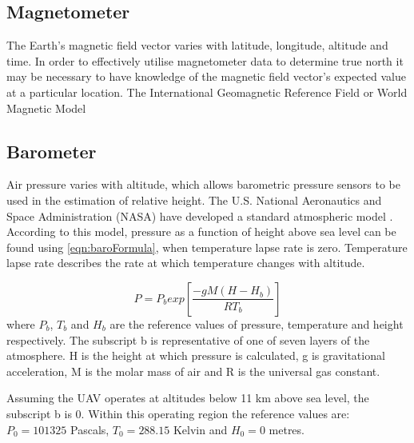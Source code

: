 \subsection{Magnetometer}
The Earth's magnetic field vector varies with latitude, longitude, altitude and time. In order to effectively utilise magnetometer data to determine true north it may be necessary to have knowledge of the magnetic field vector's expected value at a particular location. The International Geomagnetic Reference Field or World Magnetic Model

\subsection{Barometer}\label{section:barometerBackground}
Air pressure varies with altitude, which allows barometric pressure sensors to be used in the estimation of relative height. The U.S. National Aeronautics and Space Administration (NASA) have developed a standard atmospheric model \cite{Oceanic1976}. According to this model, pressure as a function of height above sea level can be found using \eqref{eqn:baroFormula}, when temperature lapse rate is zero. Temperature lapse rate describes the rate at which temperature changes with altitude. 

\begin{equation}\label{eqn:baroFormula}
P=P_{b}exp\left[\frac{-g M (H-H_{b})}{R T_{b}}\right]
\end{equation}
where $P_{b}$, $T_{b}$ and $H_{b}$ are the reference values of pressure, temperature and height respectively. The subscript b is representative of one of seven layers of the atmosphere. H is the height at which pressure is calculated, g is gravitational acceleration, M is the molar mass of air and R is the universal gas constant. 

Assuming the UAV operates at altitudes below 11 km above sea level, the subscript b is 0. Within this operating region the reference values are: $P_{0}=101 325$ Pascals, $T_{0}=288.15$ Kelvin and $H_{0}=0$ metres.

